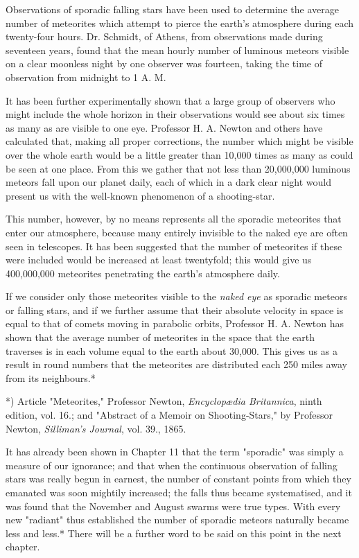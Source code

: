 \documentclass[a4paper, 12pt, oneside, polutonikogreek, english]{article}
\begin{document}
Observations of sporadic falling stars have been used to determine the average number of meteorites which attempt to pierce the earth's atmosphere during each twenty-four hours. Dr. Schmidt, of Athens, from observations made during seventeen years, found that the mean hourly number of luminous meteors visible on a clear moonless night by one observer was fourteen, taking the time of observation from midnight to 1 A. M.

It has been further experimentally shown that a large group of observers who might include the whole horizon in their observations would see about six times as many as are visible to one eye. Professor H. A. Newton and others have calculated that, making all proper corrections, the number which might be visible over the whole earth would be a little greater than 10,000 times as many as could be seen at one place. From this we gather that not less than 20,000,000 luminous meteors fall upon our planet daily, each of which in a dark clear night would present us with the well-known phenomenon of a shooting-star.

This number, however, by no means represents all the sporadic meteorites that enter our atmosphere, because many entirely invisible to the naked eye are often seen in telescopes. It has been suggested that the number of meteorites if these were included would be increased at least twentyfold; this would give us 400,000,000 meteorites penetrating the earth's atmosphere daily.

If we consider only those meteorites visible to the \emph{naked eye} as sporadic meteors or falling stars, and if we further assume that their absolute velocity in space is equal to that of comets moving in parabolic orbits, Professor H. A. Newton has shown that the average number of meteorites in the space that the earth traverses is in each volume equal to the earth about 30,000. This gives us as a result in round numbers that the meteorites are distributed each 250 miles away from its neighbours.*

*) Article "Meteorites," Professor Newton, \emph{Encyclopædia Britannica}, ninth edition, vol. 16.; and "Abstract of a Memoir on Shooting-Stars," by Professor Newton, \emph{Silliman's Journal}, vol. 39., 1865.

It has already been shown in Chapter 11 that the term "sporadic" was simply a measure of our ignorance; and that when the continuous observation of falling stars was really begun in earnest, the number of constant points from which they emanated was soon mightily increased; the falls thus became systematised, and it was found that the November and August swarms were true types. With every new "radiant" thus established the number of sporadic meteors naturally became less and less.* There will be a further word to be said on this point in the next chapter.
\end{document}
